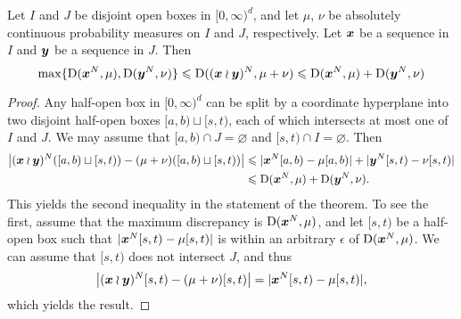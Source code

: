 \begin{theorem}
Let $I$ and $J$ be disjoint open boxes in $[0,\infty)^d$, and let $\mu$, 
$\nu$ be absolutely continuous probability measures on $I$ and $J$, 
respectively. Let ${\boldsymbol x}$ be a sequence in $I$ and ${\boldsymbol y}$ be a sequence in $J$. 
Then 
\[
	\max\{\operatorname{D}({\boldsymbol x}^N,\mu),\operatorname{D}({\boldsymbol y}^N,\nu)\} \leqslant \operatorname{D}(({\boldsymbol x}\wr{\boldsymbol y})^N, \mu+\nu) \leqslant \operatorname{D}({\boldsymbol x}^N,\mu) + \operatorname{D}({\boldsymbol y}^N,\nu)
\]
\end{theorem}
\begin{proof}
Any half-open box in $[0,\infty)^d$ can be split by a coordinate 
hyperplane into two disjoint half-open boxes $[a,b)\sqcup [s,t)$, each of which 
intersects at most one of $I$ and $J$. We may assume that 
$[a,b)\cap J=\varnothing$ and $[s,t)\cap I = \varnothing$. Then 
\begin{align*}
	\left| ({\boldsymbol x}\wr{\boldsymbol y})^N([a,b)\sqcup [s,t)) - (\mu+\nu)([a,b)\sqcup[s,t))\right| 
		&\leqslant |{\boldsymbol x}^N[a,b) - \mu[a,b)| + |{\boldsymbol y}^N[s,t) - \nu[s,t)| \\
		&\leqslant \operatorname{D}({\boldsymbol x}^N,\mu) + \operatorname{D}({\boldsymbol y}^N,\nu) .
\end{align*}
This yields the second inequality in the statement of the theorem. To see the 
first, assume that the maximum discrepancy is $\operatorname{D}({\boldsymbol x}^N,\mu)$, and let 
$[s,t)$ be a half-open box such that $|{\boldsymbol x}^N[s,t) - \mu[s,t)|$ is within an 
arbitrary $\epsilon$ of $\operatorname{D}({\boldsymbol x}^N,\mu)$. We can assume that $[s,t)$ does not 
intersect $J$, and thus 
\[
	\left|({\boldsymbol x}\wr{\boldsymbol y})^N[s,t) - (\mu+\nu)[s,t)\right| = |{\boldsymbol x}^N[s,t) - \mu[s,t)| ,
\]
which yields the result. 
\end{proof}

